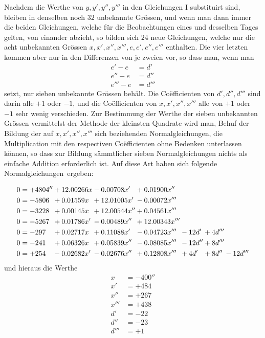 Nachdem die Werthe von $y,y',y'',y'''$ in den Gleichungen I substituirt sind, bleiben in denselben noch $32$ unbekannte Grössen, und wenn man dann immer die beiden Gleichungen, welche für die Beobachtungen eines und desselben Tages gelten, von einander abzieht, so bilden sich $24$ neue Gleichungen, welche nur die acht unbekannten Grössen $x,x',x'',x''',e,e',e'',e'''$ enthalten. Die vier letzten kommen aber nur in den Differenzen von je zweien vor, so dass man, wenn man
\[
\begin{aligned}
e'-e&=d'\\
e''-e&=d''\\
e'''-e&=d'''
\end{aligned}
\]
setzt, nur sieben unbekannte Grössen behält. Die Coëfficienten von $d',d'',d'''$ sind darin alle $+1$ oder $-1$, und die Coëfficienten von $x,x',x'',x'''$ alle von $+1$ oder $-1$ sehr wenig verschieden. Zur Bestimmung der Werthe der sieben unbekannten Grössen vermittelst der Methode der kleinsten Quadrate wird man, Behuf der Bildung der auf $x,x',x'',x'''$ sich beziehenden Normalgleichungen, die Multiplication mit den respectiven Coëfficienten ohne Bedenken unterlassen können, so dass zur Bildung sämmtlicher sieben Normalgleichungen nichts als einfache Addition erforderlich ist. Auf diese Art haben sich folgende \mbox{Normalgleichungen ergeben:}
\par\clearpage
{}
\[
\resizebox{.94\linewidth}{!}{$\displaystyle
\begin{alignedat}{7}
0&=+4804'' &&{}+12.00266x &&{}-0.00708x' &&{}+0.01900x''\\
0&=-5806 &&{}+0.01559x &&{}+12.01005x' &&{}-0.00072x'''\\
0&=-3228 &&{}+0.00145x &&{}+12.00544x'' &&{}+0.04561x'''\\
0&=-5267 &&{}+0.01786x' &&{}-0.00489x'' &&{}+12.00343x'''\\
0&=-297 &&{}+0.02717x &&{}+0.11088x' &&{}-0.04723x''' &&{}-12d' &&{}+4d'''\\
0&=-241 &&{}+0.06326x &&{}+0.05839x'' &&{}-0.08085x''' &&{}-12d'' &&{}+8d'''\\
0&=+254 &&{}-0.02682x' &&{}-0.02676x'' &&{}+0.12808x''' &&{}+4d' &&{}+8d'' &&{}-12d'''
\end{alignedat}$}
\]
und hieraus die Werthe
\[
\begin{aligned}
x&=-400''\\
x'&=+484\\
x''&=+267\\
x'''&=+438\\
d'&=-22\\
d''&=-23\\
d'''&=+1
\end{aligned}
\]
